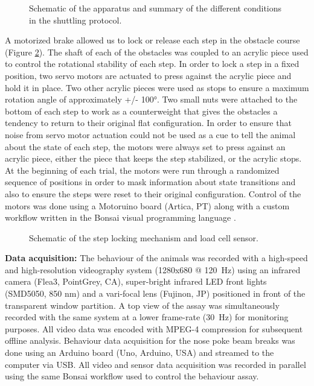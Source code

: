 \begin{figure}
\begin{center}

\end{center}
\vspace{-5mm}
\caption{Schematic of the apparatus and summary of the different conditions in the shuttling protocol.}
\label{fig:shuttlingProtocol}
\end{figure}

A motorized brake allowed us to lock or release each step in the obstacle course (Figure \ref{fig:shuttlingSteps}). The shaft of each of the obstacles was coupled to an acrylic piece used to control the rotational stability of each step. In order to lock a step in a fixed position, two servo motors are actuated to press against the acrylic piece and hold it in place. Two other acrylic pieces were used as stops to ensure a maximum rotation angle of approximately +/- \ang{100}. Two small nuts were attached to the bottom of each step to work as a counterweight that gives the obstacles a tendency to return to their original flat configuration. In order to ensure that noise from servo motor actuation could not be used as a cue to tell the animal about the state of each step, the motors were always set to press against an acrylic piece, either the piece that keeps the step stabilized, or the acrylic stops. At the beginning of each trial, the motors were run through a randomized sequence of positions in order to mask information about state transitions and also to ensure the steps were reset to their original configuration. Control of the motors was done using a Motoruino board (Artica, PT) along with a custom workflow written in the Bonsai visual programming language \cite{Lopes2015a}.

\begin{figure}
\begin{center}

\end{center}
\vspace{-5mm}
\caption{Schematic of the step locking mechanism and load cell sensor.}
\label{fig:shuttlingSteps}
\end{figure}

\textbf{Data acquisition:} The behaviour of the animals was recorded with a high-speed and high-resolution videography system (1280x680 @ \SI{120}{\hertz}) using an infrared camera (Flea3, PointGrey, CA), super-bright infrared LED front lights (SMD5050, 850 nm) and a vari-focal lens (Fujinon, JP) positioned in front of the transparent window partition. A top view of the assay was simultaneously recorded with the same system at a lower frame-rate (\SI{30}{\hertz}) for monitoring purposes. All video data was encoded with MPEG-4 compression for subsequent offline analysis. Behaviour data acquisition for the nose poke beam breaks was done using an Arduino board (Uno, Arduino, USA) and streamed to the computer via USB. All video and sensor data acquisition was recorded in parallel using the same Bonsai workflow used to control the behaviour assay.

